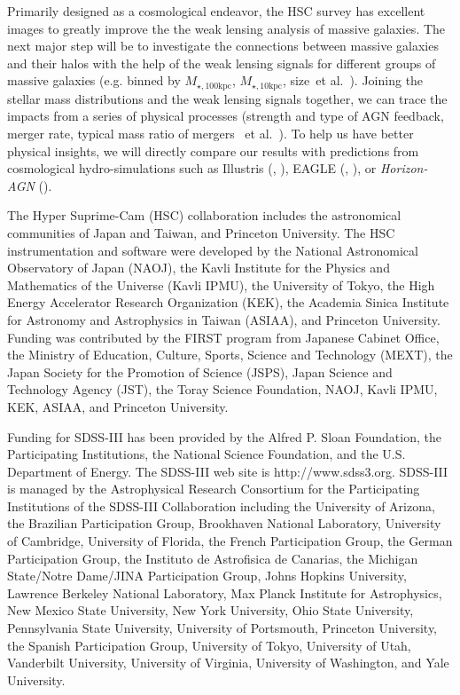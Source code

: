 \documentclass{emulateapj}
\def\etal{{\ et al.~}}
\def\minn{{$M_{\star,10\mathrm{kpc}}$}}
\def\mtot{{$M_{\star,100\mathrm{kpc}}$}}
\begin{document}
\begin{CJK*}{UTF8}{gbsn}
    Primarily designed as a cosmological endeavor, the HSC survey has excellent 
    images to greatly improve the the weak lensing analysis of massive galaxies. 
    The next major step will be to investigate the connections between massive 
    galaxies and their halos with the help of the weak lensing signals for 
    different groups of massive galaxies (e.g. binned by \mtot{}, \minn{}, 
    size\etal).
    Joining the stellar mass distributions and the weak lensing signals together, 
    we can trace the impacts from a series of physical processes 
    (strength and type of AGN feedback, merger rate, typical mass ratio of mergers
    \etal). 
    To help us have better physical insights, we will directly compare our results 
    with predictions from cosmological hydro-simulations such as 
    Illustris (\citealt{Vogelsberger2014}, \citealt{Genel2014}), 
    EAGLE (\citealt{Schaye2015}, \citealt{Crain2015}), 
    or \textit{Horizon-AGN} (\citealt{Dubois2014}). 

  
  
\acknowledgements

  The Hyper Suprime-Cam (HSC) collaboration includes the astronomical communities of 
  Japan and Taiwan, and Princeton University.  The HSC instrumentation and software were
  developed by the National Astronomical Observatory of Japan (NAOJ), the Kavli Institute
  for the Physics and Mathematics of the Universe (Kavli IPMU), the University of Tokyo,
  the High Energy Accelerator Research Organization (KEK), the Academia Sinica Institute
  for Astronomy and Astrophysics in Taiwan (ASIAA), and Princeton University.  
  Funding was contributed by the FIRST program from Japanese Cabinet Office, the Ministry 
  of Education, Culture, Sports, Science and Technology (MEXT), the Japan Society for 
  the Promotion of Science (JSPS), Japan Science and Technology Agency (JST), the
  Toray Science Foundation, NAOJ, Kavli IPMU, KEK, ASIAA, and Princeton University.
   
  Funding for SDSS-III has been provided by the Alfred P. Sloan Foundation, the
  Participating Institutions, the National Science Foundation, and the U.S.  Department of
  Energy. The SDSS-III web site is http://www.sdss3.org.  SDSS-III is managed by the
  Astrophysical Research Consortium for the Participating Institutions of the SDSS-III
  Collaboration including the University of Arizona, the Brazilian Participation Group,
  Brookhaven National Laboratory, University of Cambridge, University of Florida, the
  French Participation Group, the German Participation Group, the Instituto de Astrofisica
  de Canarias, the Michigan State/Notre Dame/JINA Participation Group, Johns Hopkins
  University, Lawrence Berkeley National Laboratory, Max Planck Institute for
  Astrophysics, New Mexico State University, New York University, Ohio State University,
  Pennsylvania State University, University of Portsmouth, Princeton University, the
  Spanish Participation Group, University of Tokyo, University of Utah, Vanderbilt
  University, University of Virginia, University of Washington, and Yale University.
  

\end{CJK*}
\end{document}

